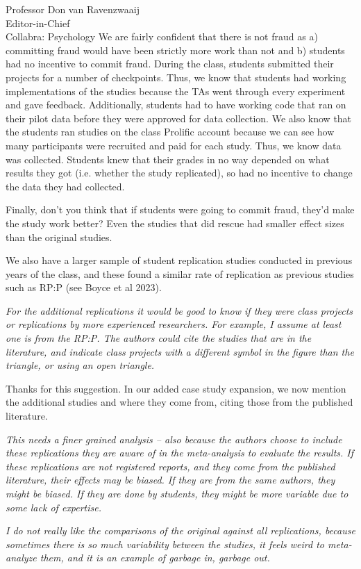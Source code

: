 \documentclass{stanfordletter}
\newcommand{\theysaid}[1]{\begin{leftbar} \noindent 
		\textsl{ #1}\end{leftbar}}
\begin{document}
\begin{letter}{Professor Don van Ravenzwaaij \\ Editor-in-Chief \\ Collabra: Psychology }
		We are fairly confident that there is not fraud as a) committing fraud would have been strictly more work than not and b) students had no incentive to commit fraud. During the class, students submitted their projects for a number of checkpoints. Thus, we know that students had working implementations of the studies because the TAs went through every experiment and gave feedback. Additionally, students had to have working code that ran on their pilot data before they were approved for data collection. We also know that the students ran studies on the class Prolific account because we can see how many participants were recruited and paid for each study. Thus, we know data was collected. Students knew that their grades in no way depended on what results they got (i.e. whether the study replicated), so had no incentive to change the data they had collected. 
		
		Finally, don't you think that if students were going to commit fraud, they'd make the study work better? Even the studies that did rescue had smaller effect sizes than the original studies. 
		
		We also have a larger sample of student replication studies conducted in previous years of the class, and these found a similar rate of replication as previous studies such as RP:P (see Boyce et al 2023). 
		
		
		\theysaid{For the additional replications it would be good to know if they were class projects or replications by more experienced researchers. For example, I assume at least one is from the RP:P. The authors could cite the studies that are in the literature, and indicate class projects with a different symbol in the figure than the triangle, or using an open triangle. }
		
		Thanks for this suggestion. In our added case study expansion, we now mention the additional studies and where they come from, citing those from the published literature. 
		
		
		\theysaid{This needs a finer grained analysis – also because the authors choose to include these replications they are aware of in the meta-analysis to evaluate the results. If these replications are not registered reports, and they come from the published literature, their effects may be biased. If they are from the same authors, they might be biased. If they are done by students, they might be more variable due to some lack of expertise.}
		
		\theysaid{I do not really like the comparisons of the original against all replications, because sometimes there is so much variability between the studies, it feels weird to meta-analyze them, and it is an example of garbage in, garbage out.}
		

\end{letter}
\end{document}

